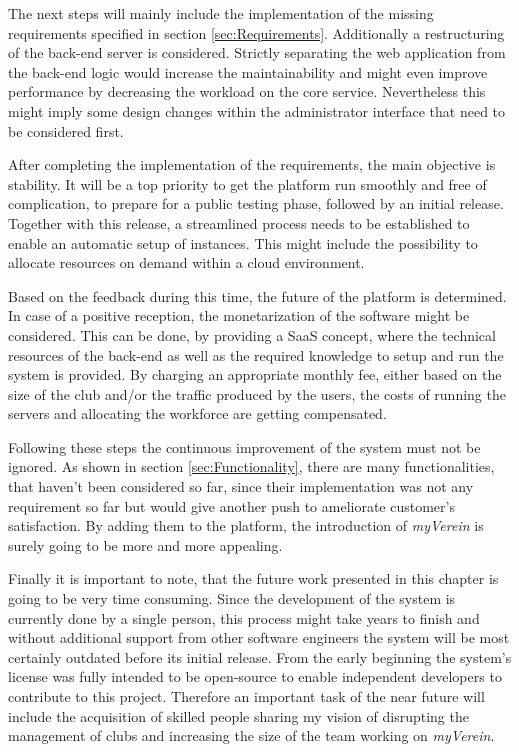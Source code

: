 The next steps will mainly include the implementation of the missing requirements specified in section \vref{sec:Requirements}. Additionally a restructuring of the back-end server is considered. Strictly separating the web application from the back-end logic would increase the maintainability and might even improve performance by decreasing the workload on the core service. Nevertheless this might imply some design changes within the administrator interface that need to be considered first.

After completing the implementation of the requirements, the main objective is stability. It will be a top priority to get the platform run smoothly and free of complication, to prepare for a public testing phase, followed by an initial release. Together with this release, a streamlined process needs to be established to enable an automatic setup of instances. This might include the possibility to allocate resources on demand within a cloud environment.

Based on the feedback during this time, the future of the platform is determined. In case of a positive reception, the monetarization of the software might be considered. This can be done, by providing a \gls{SaaS} concept, where the technical resources of the back-end as well as the required knowledge to setup and run the system is provided. By charging an appropriate monthly fee, either based on the size of the club and/or the traffic produced by the users, the costs of running the servers and allocating the workforce are getting compensated.

Following these steps the continuous improvement of the system must not be ignored. As shown in section \vref{sec:Functionality}, there are many functionalities, that haven't been considered so far, since their implementation was not any requirement so far but would give another push to ameliorate customer's satisfaction. By adding them to the platform, the introduction of \emph{myVerein} is surely going to be more and more appealing.

Finally it is important to note, that the future work presented in this chapter is going to be very time consuming. Since the development of the system is currently done by a single person, this process might take years to finish and without additional support from other software engineers the system will be most certainly outdated before its initial release. From the early beginning the system's license was fully intended to be open-source to enable independent developers to contribute to this project. Therefore an important task of the near future will include the acquisition of skilled people sharing my vision of disrupting the management of clubs and increasing the size of the team working on \emph{myVerein}.





